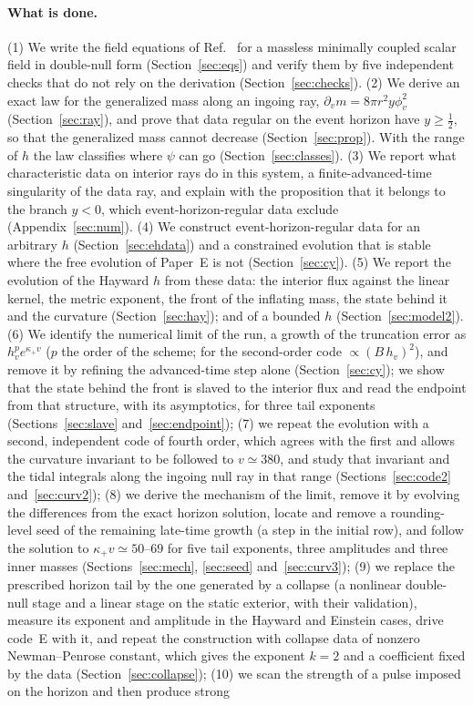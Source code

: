 \documentclass[11pt]{article}
\begin{document}
\paragraph{What is done.} (1) We write the field equations of Ref.~\cite{BuenoCanoHennigarMurcia2025} for a massless minimally coupled scalar field in double-null form (Section~\ref{sec:eqs}) and verify them by five independent checks that do not rely on the derivation (Section~\ref{sec:checks}). (2) We derive an exact law for the generalized mass along an ingoing ray, $\partial_vm=8\pi r^{2}y\phi_v^{2}$ (Section~\ref{sec:ray}), and prove that data regular on the event horizon have $y\ge\tfrac12$, so that the generalized mass cannot decrease (Section~\ref{sec:prop}). With the range of $h$ the law classifies where $\psi$ can go (Section~\ref{sec:classes}). (3) We report what characteristic data on interior rays do in this system, a finite-advanced-time singularity of the data ray, and explain with the proposition that it belongs to the branch $y<0$, which event-horizon-regular data exclude (Appendix~\ref{sec:num}). (4) We construct event-horizon-regular data for an arbitrary $h$ (Section~\ref{sec:ehdata}) and a constrained evolution that is stable where the free evolution of Paper~E is not (Section~\ref{sec:cy}). (5) We report the evolution of the Hayward $h$ from these data: the interior flux against the linear kernel, the metric exponent, the front of the inflating mass, the state behind it and the curvature (Section~\ref{sec:hay}); and of a bounded $h$ (Section~\ref{sec:model2}). (6) We identify the numerical limit of the run, a growth of the truncation error as $h_v^{p}e^{\kappa_+v}$ ($p$ the order of the scheme; for the second-order code $\propto(B\,h_v)^{2}$), and remove it by refining the advanced-time step alone (Section~\ref{sec:cy}); we show that the state behind the front is slaved to the interior flux and read the endpoint from that structure, with its asymptotics, for three tail exponents (Sections~\ref{sec:slave} and~\ref{sec:endpoint}); (7) we repeat the evolution with a second, independent code of fourth order, which agrees with the first and allows the curvature invariant to be followed to $v\simeq380$, and study that invariant and the tidal integrals along the ingoing null ray in that range (Sections~\ref{sec:code2} and~\ref{sec:curv2}); (8) we derive the mechanism of the limit, remove it by evolving the differences from the exact horizon solution, locate and remove a rounding-level seed of the remaining late-time growth (a step in the initial row), and follow the solution to $\kappa_+v\simeq50$--$69$ for five tail exponents, three amplitudes and three inner masses (Sections~\ref{sec:mech}, \ref{sec:seed} and~\ref{sec:curv3}); (9) we replace the prescribed horizon tail by the one generated by a collapse (a nonlinear double-null stage and a linear stage on the static exterior, with their validation), measure its exponent and amplitude in the Hayward and Einstein cases, drive code~E with it, and repeat the construction with collapse data of nonzero Newman--Penrose constant, which gives the exponent $k=2$ and a coefficient fixed by the data (Section~\ref{sec:collapse}); (10) we scan the strength of a pulse imposed on the horizon and then produce strong 
\end{document}

